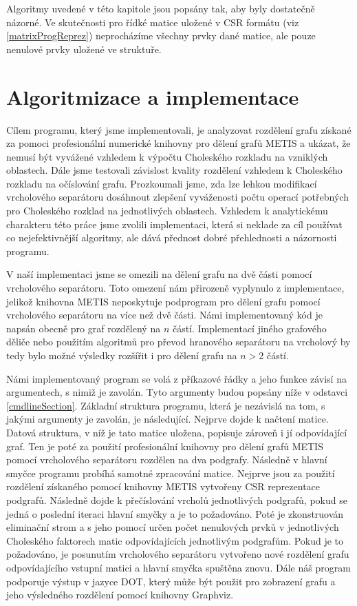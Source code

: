 \documentclass{ctuthesis}
\theoremstyle{plain}
\theoremstyle{definition}
\begin{document}
Algoritmy uvedené v této kapitole jsou popsány tak, aby byly dostatečně názorné. Ve skutečnosti pro řídké matice uložené v CSR formátu (viz \ref{matrixProgReprez}) neprocházíme všechny prvky dané matice, ale pouze nenulové prvky uložené ve struktuře.


\chapter{Algoritmizace a implementace}

Cílem programu, který jsme implementovali, je analyzovat rozdělení grafu získané za pomoci profesionální numerické knihovny pro dělení grafů METIS a ukázat, že nemusí být vyvážené vzhledem k výpočtu Choleského rozkladu na vzniklých oblastech. Dále jsme testovali závislost kvality rozdělení vzhledem k Choleského rozkladu na očíslování grafu. Prozkoumali jsme, zda lze lehkou modifikací vrcholového separátoru dosáhnout zlepšení vyváženosti počtu operací potřebných pro Choleského rozklad na jednotlivých oblastech. Vzhledem k analytickému charakteru této práce jsme zvolili implementaci, která si neklade za cíl používat co nejefektivnější algoritmy, ale dává přednost dobré přehlednosti a názornosti programu.

V naší implementaci jsme se omezili na dělení grafu na dvě části pomocí vrcholového separátoru. Toto omezení nám přirozeně vyplynulo z implementace, jelikož knihovna METIS neposkytuje podprogram pro dělení grafu pomocí vrcholového separátoru na více než dvě části. Námi implementovaný kód je napsán obecně pro graf rozdělený na $n$ částí. Implementací jiného grafového děliče nebo použitím algoritmů pro převod hranového separátoru na vrcholový by tedy bylo možné výsledky rozšířit i pro dělení grafu na $n>2$ částí.

Námi implementovaný program se volá z příkazové řádky a jeho funkce závisí na argumentech, s nimiž je zavolán. Tyto argumenty budou popsány níže v odstavci \ref{cmdlineSection}. Základní struktura programu, která je nezávislá na tom, s jakými argumenty je zavolán, je následující. Nejprve dojde k načtení matice. Datová struktura, v níž je tato matice uložena, popisuje zároveň i jí odpovídající graf. Ten je poté za použití profesionální knihovny pro dělení grafů METIS pomocí vrcholového separátoru rozdělen na dva podgrafy. Následně v hlavní smyčce programu probíhá samotné zpracování matice. Nejprve jsou za použití rozdělení získaného pomocí knihovny METIS vytvořeny CSR reprezentace podgrafů. Následně dojde k přečíslování vrcholů jednotlivých podgrafů, pokud se jedná o poslední iteraci hlavní smyčky a je to požadováno. Poté je zkonstruován eliminační strom a s jeho pomocí určen počet nenulových prvků v jednotlivých Choleského faktorech matic odpovídajících jednotlivým podgrafům. Pokud je to požadováno, je posunutím vrcholového separátoru vytvořeno nové rozdělení grafu odpovídajícího vstupní matici a hlavní smyčka spuštěna znovu. Dále náš program podporuje výstup v jazyce DOT, který může být použit pro zobrazení grafu a jeho výsledného rozdělení pomocí knihovny Graphviz.
\end{document}
